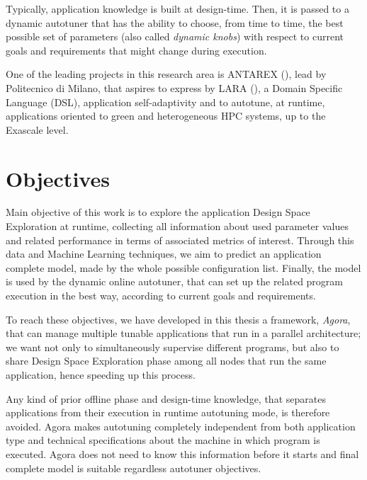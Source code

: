 Typically, application knowledge is built at design-time. Then, it is passed to a dynamic autotuner that has the ability to choose, from time to time, the best possible set of parameters (also called \textit{dynamic knobs}) with respect to current goals and requirements that might change during execution.

One of the leading projects in this research area is ANTAREX (\cite{silvano2016antarex}), lead by Politecnico di Milano, that aspires to express by LARA (\cite{cardoso2012lara, cardoso2014performance}), a Domain Specific Language (DSL), application self-adaptivity and to autotune, at runtime, applications oriented to green and heterogeneous HPC systems, up to the Exascale level.





\section{Objectives}

Main objective of this work is to explore the application Design Space Exploration at runtime, collecting all information about used parameter values and related performance in terms of associated metrics of interest. Through this data and Machine Learning techniques, we aim to predict an application complete model, made by the whole possible configuration list. Finally, the model is used by the dynamic online autotuner, that can set up the related program execution in the best way, according to current goals and requirements.

To reach these objectives, we have developed in this thesis a framework, \textit{Agora}, that can manage multiple tunable applications that run in a parallel architecture; we want not only to simultaneously supervise different programs, but also to share Design Space Exploration phase among all nodes that run the same application, hence speeding up this process.

Any kind of prior offline phase and design-time knowledge, that separates applications from their execution in runtime autotuning mode, is therefore avoided. Agora makes autotuning completely independent from both application type and technical specifications about the machine in which program is executed. Agora does not need to know this information before it starts and final complete model is suitable regardless autotuner objectives.





